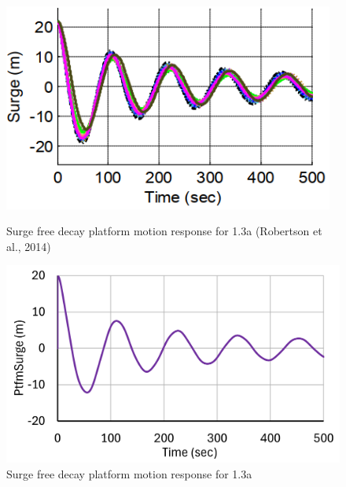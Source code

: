 \documentclass[a4paper, 11pt]{article}
\begin{document}
\begin{figure}[H]
    \begin{minipage}{0.48\textwidth}
        \centering
        \includegraphics[width=0.97\textwidth]{1.3a_surge.png}
        \caption{\small Surge free decay platform motion response for 1.3a (Robertson et al., 2014)}
        \label{fig:1.3a_surge}
    \end{minipage}
    \hfill
    \begin{minipage}{0.49\textwidth}
        \centering
        \includegraphics[width=1\textwidth]{1.3a_surge_mine.png}
        \caption{\small Surge free decay platform motion response for 1.3a}
        \label{fig:1.3a_surge_mine}
    \end{minipage}
\end{figure}
\end{document}
